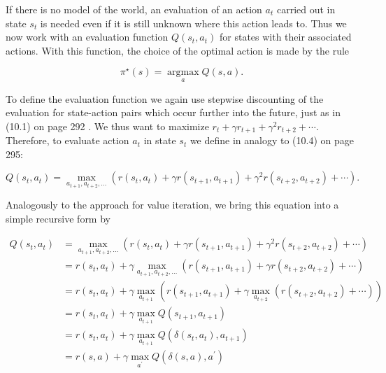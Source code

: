 \documentclass[10pt]{article}
\begin{document}
If there is no model of the world, an evaluation of an action $a_{t}$ carried out in state $s_{t}$ is needed even if it is still unknown where this action leads to. Thus we now work with an evaluation function $Q\left(s_{t}, a_{t}\right)$ for states with their associated actions. With this function, the choice of the optimal action is made by the rule


\begin{equation*}
\pi^{\star}(s)=\underset{a}{\operatorname{argmax}} Q(s, a) . \tag{10.9}
\end{equation*}


To define the evaluation function we again use stepwise discounting of the evaluation for state-action pairs which occur further into the future, just as in (10.1) on page 292 . We thus want to maximize $r_{t}+\gamma r_{t+1}+\gamma^{2} r_{t+2}+\cdots$. Therefore, to evaluate action $a_{t}$ in state $s_{t}$ we define in analogy to (10.4) on page 295:


\begin{equation*}
Q\left(s_{t}, a_{t}\right)=\max _{a_{t+1}, a_{t+2}, \ldots}\left(r\left(s_{t}, a_{t}\right)+\gamma r\left(s_{t+1}, a_{t+1}\right)+\gamma^{2} r\left(s_{t+2}, a_{t+2}\right)+\cdots\right) . \tag{10.10}
\end{equation*}


Analogously to the approach for value iteration, we bring this equation into a simple recursive form by


\begin{align*}
Q\left(s_{t}, a_{t}\right) & =\max _{a_{t+1}, a_{t+2}, \ldots}\left(r\left(s_{t}, a_{t}\right)+\gamma r\left(s_{t+1}, a_{t+1}\right)+\gamma^{2} r\left(s_{t+2}, a_{t+2}\right)+\cdots\right) \\
& =r\left(s_{t}, a_{t}\right)+\gamma \max _{a_{t+1}, a_{t+2}, \ldots}\left(r\left(s_{t+1}, a_{t+1}\right)+\gamma r\left(s_{t+2}, a_{t+2}\right)+\cdots\right) \\
& =r\left(s_{t}, a_{t}\right)+\gamma \max _{a_{t+1}}\left(r\left(s_{t+1}, a_{t+1}\right)+\gamma \max _{a_{t+2}}\left(r\left(s_{t+2}, a_{t+2}\right)+\cdots\right)\right) \\
& =r\left(s_{t}, a_{t}\right)+\gamma \max _{a_{t+1}} Q\left(s_{t+1}, a_{t+1}\right) \\
& =r\left(s_{t}, a_{t}\right)+\gamma \max _{a_{t+1}} Q\left(\delta\left(s_{t}, a_{t}\right), a_{t+1}\right) \\
& =r(s, a)+\gamma \max _{a^{\prime}} Q\left(\delta(s, a), a^{\prime}\right) \tag{10.11}
\end{align*}
\end{document}
